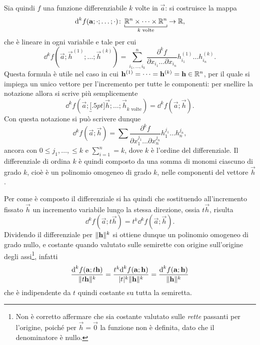 Sia quindi $f$ una funzione differenziabile $k$ volte in $\vec a$: si costruisce la mappa
\begin{equation} \label{eq:diff-kesimo}
\dd^kf(\vec a;\cdot;\dots;\cdot)\colon\underbracket[.5pt]{\R^n\times\dots\times\R^n}_\text{$k$ volte}\to\R,
\end{equation}
che è lineare in ogni variabile e tale per cui
\begin{equation}
\dd^kf(\vec a;\vec h^{(1)};\dots;\vec h^{(k)})=
\sum_{i_1,\dots,i_k}^n\frac{\partial^kf}{\partial x_{i_1}\dots\partial x_{i_n}}
h_{i_1}^{(1)}\dots h_{i_n}^{(k)}.
\end{equation}
Questa formula è utile nel caso in cui $\mathbf{h}^{(1)}=\dots=\mathbf{h}^{(k)}=\mathbf{h}\in\mathbb{R}^n$, per il quale si impiega un unico vettore per l'incremento per tutte le componenti: per snellire la notazione allora si scrive più semplicemente
\[
\dd^kf(\vec a;\underbracket[.5pt]{\vec h;\dots;\vec h}_\text{$k$ volte})=\dd^kf(\vec a;\vec h).
\]
Con questa notazione si può scrivere dunque
\begin{equation}
\dd^kf(\vec a;\vec h)=\sum\frac{\partial^kf}{\partial x_1^{j_1}\dots\partial x_n^{j_n}} h_1^{j_1}\dots h_n^{j_n},
\end{equation}
ancora con $0\leq j_1,\dots,\leq k$ e $\sum_{i=1}^n=k$, dove $k$ è l'ordine del differenziale. Il differenziale di ordina $k$ è quindi%
 composto da una somma di monomi ciascuno di grado $k$, cioè è un polinomio omogeneo di grado $k$, nelle componenti del vettore $\vec h$.

Per come è composto il differenziale si ha quindi che sostituendo all'incremento fissato $\vec h$ un incremento variabile lungo la stessa direzione, ossia $t\vec h$, risulta
\begin{equation}
\dd^kf(\vec a;t\vec h)=t^k\dd^kf(\vec a;\vec h).
\end{equation}
Dividendo il differenziale per $\lVert\mathbf{h}\rVert^k$ si ottiene dunque un polinomio omogeneo di grado nullo, e costante quando valutato sulle semirette con origine sull'origine degli assi\footnote{Non è corretto affermare che sia costante valutato sulle \emph{rette} passanti per l'origine, poiché per $\vec h=\vec 0$ la funzione non è definita, dato che il denominatore è nullo.}, infatti
\[
\frac{\textup{d}^kf(\mathbf{a};t\mathbf{h})}{\lVert t\mathbf{h}\rVert^k}=\frac{t^k\textup{d}^kf(\mathbf{a};\mathbf{h})}{\lvert t\rvert^k\lVert\mathbf{h}\rVert^k}=\frac{\textup{d}^kf(\mathbf{a};\mathbf{h})}{\lVert\mathbf{h}\rVert^k}
\]
che è indipendente da $t$ quindi costante su tutta la semiretta.

